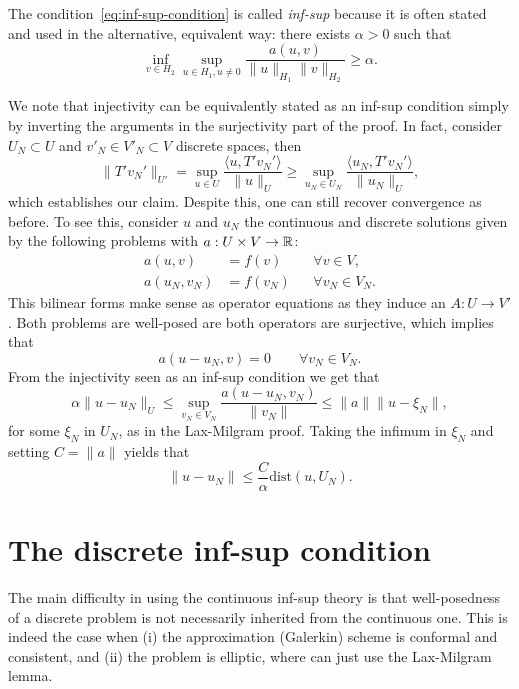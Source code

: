 The condition~\ref{eq:inf-sup-condition} is called \emph{inf-sup} because it is often stated and used in the alternative, equivalent way: there exists $\alpha>0$ such that 
\begin{equation}
    \inf_{v\in H_2}\sup_{u\in H_1,u\neq 0} \frac{a(u,v)}{\| u \|_{H_1}\|v\|_{H_2}} \ge \alpha.
\end{equation}

We note that injectivity can be equivalently stated as an inf-sup condition simply by inverting the arguments in the surjectivity part of the proof. In fact, consider $U_N\subset U$ and $v'_N\in V'_N\subset V$ discrete spaces, then 
\begin{equation*}
    \|T'v_N'\|_{U'} = \sup_{u\in U}\frac{\langle u, T'v_N'\rangle}{\|u\|_U} \geq \sup_{u_N\in U_N}\frac{\langle u_N, T'v_N'\rangle}{\|u_N\|_U},
\end{equation*}
which establishes our claim. Despite this, one can still recover convergence as before. To see this, consider $u$ and $u_N$ the continuous and discrete solutions given by the following problems with $a:U\times V \to \mathbb{R}$:
\begin{equation*}
    \begin{aligned}
        a(u,v) &= f(v) &&\forall v\in V,\\
        a(u_N, v_N) &= f(v_N) &&\forall v_N\in V_N.
    \end{aligned}
\end{equation*}
This bilinear forms make sense as operator equations as they induce an $A:U\to V'$. Both problems are well-posed are both operators are surjective, which implies that 
\begin{equation*}
    a(u-u_N, v) = 0  \qquad \forall v_N \in V_N.
\end{equation*}
From the injectivity seen as an inf-sup condition we get that
\begin{equation*}
    \alpha \| u - u_N \|_U \leq \sup_{v_N\in V_N} \frac{a(u-u_N, v_N)}{\|v_N\|} \leq \| a \| \|u - \xi_N \|,
\end{equation*}
for some $\xi_N$ in $U_N$, as in the Lax-Milgram proof. Taking the infimum in $\xi_N$ and setting $C=\|a\|$ yields that
\begin{equation*}
    \| u - u_N \| \leq \frac{C}{\alpha}\text{dist}(u, U_N).
\end{equation*}

\section{The discrete inf-sup condition}\label{sec:inf-sup-discrete}
The main difficulty in using the continuous inf-sup theory is that well-posedness of a discrete problem is not necessarily inherited from the continuous one. This is indeed the case when (i) the approximation (Galerkin) scheme is conformal and consistent, and (ii) the problem is elliptic, where can just use the Lax-Milgram lemma. 

